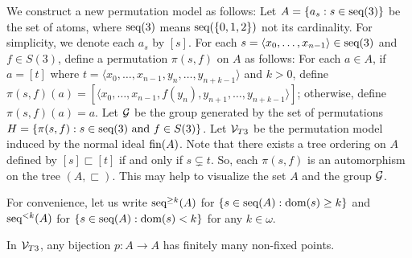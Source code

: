 We construct a new permutation model as follows: Let $A=\{a_{s}:s\in \textup{seq}(3)\}$ be the set of atoms, where $\textup{seq}(3)$ means $\textup{seq}(\{0,1,2\})$ not its cardinality. For simplicity, we denote each $a_{s}$ by $[s]$. For each $s=\langle x_{0},\dotsc, x_{n-1}\rangle\in \textup{seq}(3)$ and $f\in S(3)$, define a permutation $\pi(s,f)$ on $A$ as follows: For each $a\in A$, if $a=[t]$ where $t=\langle x_{0},\dotsc, x_{n-1},y_{n},\dotsc,y_{n+k-1}\rangle$ and $k>0$, define $\pi(s,f)(a)=[\langle x_{0},\dotsc, x_{n-1},f(y_{n}),y_{n+1},\dotsc,y_{n+k-1}\rangle]$; otherwise, define $\pi(s,f)(a)=a$. Let $\mathcal{G}$ be the group generated by the set of permutations $H=\{\pi(s,f):s\in \textup{seq}(3)\text{ and }f\in S(3)\}$. Let $\mathcal{V}_{T3}$ be the permutation model induced by the normal ideal $\textup{fin}(A)$. Note that there exists a tree ordering on $A$ defined by $[s] \sqsubset [t]$ if and only if $s\subsetneq t$. So, each $\pi(s,f)$ is an automorphism on the tree $(A,\sqsubset)$. This may help to visualize the set $A$ and the group $\mathcal{G}$.

For convenience, let us write $\textup{seq}^{\geq k}(A)$ for $\{ s\in\textup{seq}(A) : \textup{dom}(s) \geq k \}$ and $\textup{seq}^{<k}(A)$ for $\{ s\in\textup{seq}(A) : \textup{dom}(s) < k \}$ for any $k\in\omega$.

\begin{lemma}\label{VT3lemma}
In $\mathcal{V}_{T3}$, any bijection $p:A\to A$ has finitely many non-fixed points.
\end{lemma}

